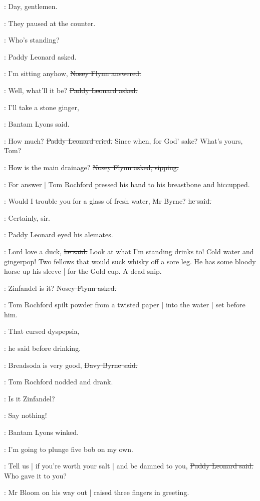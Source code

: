 \davybyrne:
Day, gentlemen.

:
They paused at the counter.

\leonard:
Who's standing?

:
Paddy Leonard asked.

\nosey:
I'm sitting anyhow,
\sout{Nosey Flynn answered.}

\leonard:
Well, what'll it be?
\sout{Paddy Leonard asked.}

\bantam:
I'll take a stone ginger,

:
Bantam Lyons said.

\leonard:
How much?
\sout{Paddy Leonard cried.}
Since when, for God' sake?
What's yours, Tom?

\nosey:
How is the main drainage?
\sout{Nosey Flynn asked, sipping.}

:
For answer |
Tom Rochford pressed his hand to his breastbone and hiccupped.

\rochford:
Would I trouble you for a glass of fresh water, Mr Byrne?
\sout{he said.}

\davybyrne:
Certainly, sir.

:
Paddy Leonard eyed his alemates.

\leonard:
Lord love a duck,
\sout{he said.}
Look at what I'm standing drinks to!
Cold water and gingerpop!
Two fellows that would suck whisky off a sore leg.
He has some bloody horse up his sleeve |
for the Gold cup.
A dead snip.

\nosey:
Zinfandel is it?
\sout{Nosey Flynn asked.}

:
Tom Rochford spilt powder from a twisted paper |
into the water |
set before him.

\rochford:
That cursed dyspepsia,

:
he said before drinking.

\davybyrne:
Breadsoda is very good,
\sout{Davy Byrne said.}

:
Tom Rochford nodded and drank.

\nosey:
Is it Zinfandel?

\bantam:
Say nothing!

:
Bantam Lyons winked.

\bantam:
I'm going to plunge five bob on my own.

\leonard:
Tell us |
if you're worth your salt |
and be damned to you,
\sout{Paddy Leonard said.}
Who gave it to you?

:
Mr Bloom on his way out |
raised three fingers in greeting.

